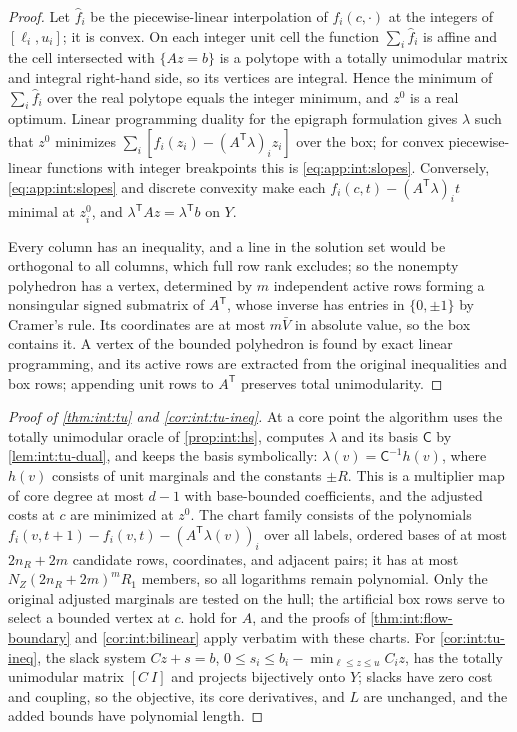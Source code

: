 \begin{proof}
Let $\hat f_i$ be the piecewise-linear interpolation of $f_i(c,\cdot)$ at the integers of
$[\ell_i,u_i]$; it is convex. On each integer unit cell the function
$\sum_i\hat f_i$ is affine and the cell intersected with $\{Az=b\}$ is a polytope with a
totally unimodular matrix and integral right-hand side, so its vertices are integral.
Hence the minimum of $\sum_i\hat f_i$ over the real polytope equals the integer minimum,
and $z^0$ is a real optimum. Linear programming duality for the epigraph formulation
gives $\lambda$ such that $z^0$ minimizes $\sum_i[\hat f_i(z_i)-(A^{\mathsf T}\lambda)_iz_i]$
over the box; for convex piecewise-linear functions with integer breakpoints this is
\eqref{eq:app:int:slopes}. Conversely, \eqref{eq:app:int:slopes} and discrete convexity
make each $f_i(c,t)-(A^{\mathsf T}\lambda)_it$ minimal at $z^0_i$, and
$\lambda^{\mathsf T}Az=\lambda^{\mathsf T}b$ on $Y$.

Every column has an inequality, and a line in the solution set would be orthogonal to
all columns, which full row rank excludes; so the nonempty polyhedron has a vertex,
determined by $m$ independent active rows forming a nonsingular signed submatrix of
$A^{\mathsf T}$, whose inverse has entries in $\{0,\pm1\}$ by Cramer's rule. Its
coordinates are at most $m\bar V$ in absolute value, so the box contains it. A vertex of
the bounded polyhedron is found by exact linear programming, and its active rows are
extracted from the original inequalities and box rows; appending unit rows to
$A^{\mathsf T}$ preserves total unimodularity.
\end{proof}

\begin{proof}[Proof of \cref{thm:int:tu} and \cref{cor:int:tu-ineq}]
At a core point the algorithm uses the totally unimodular oracle of \cref{prop:int:hs},
computes $\lambda$ and its basis $\mathsf C$ by \cref{lem:int:tu-dual}, and keeps the basis
symbolically: $\lambda(v)=\mathsf C^{-1}h(v)$, where $h(v)$ consists of unit marginals and
the constants $\pm R$. This is a multiplier map of core degree at most $d-1$ with
base-bounded coefficients, and the adjusted costs at $c$ are minimized at $z^0$. The chart
family consists of the polynomials $f_i(v,t+1)-f_i(v,t)-(A^{\mathsf T}\lambda(v))_i$ over all
labels, ordered bases of at most $2n_R+2m$ candidate rows, coordinates, and adjacent
pairs; it has at most $N_Z(2n_R+2m)^mR_1$ members, so all logarithms remain polynomial.
Only the original adjusted marginals are tested on the hull; the artificial box rows
serve to select a bounded vertex at $c$. 
hold for $A$, and the proofs of \cref{thm:int:flow-boundary} and \cref{cor:int:bilinear}
apply verbatim with these charts. For \cref{cor:int:tu-ineq}, the slack system
$Cz+s=b$, $0\le s_i\le b_i-\min_{\ell\le z\le u}C_iz$, has the totally unimodular matrix
$[C\ I]$ and projects bijectively onto $Y$; slacks have zero cost and coupling, so the
objective, its core derivatives, and $L$ are unchanged, and the added bounds have
polynomial length.
\end{proof}

